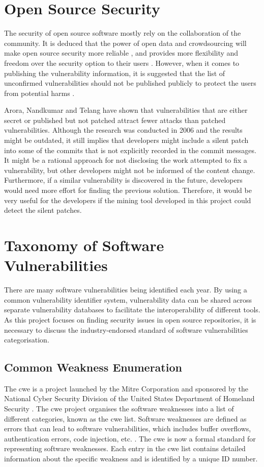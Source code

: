 \documentclass[12pt, a4paper]{report}
\begin{document}
\section{Open Source Security}
The security of open source software mostly rely on the collaboration of the community. It is
deduced that the power of open data and crowdsourcing will make open source security more reliable
\cite{hoepman_2007, witten_2001}, and provides more flexibility and freedom over the security option
to their users \cite{payne_2002}. However, when it comes to publishing the vulnerability
information, it is suggested that the list of unconfirmed vulnerabilities should not be published
publicly to protect the users from potential harms \cite{schryen_2011}.

Arora, Nandkumar and Telang \cite{arora_2006} have shown that vulnerabilities that are either secret
or published but not patched attract fewer attacks than patched vulnerabilities. Although the
research was conducted in 2006 and the results might be outdated, it still implies that developers
might include a silent patch into some of the commits that is not explicitly recorded in the commit
messages. It might be a rational approach for not disclosing the work attempted to fix a
vulnerability, but other developers might not be informed of the content change. Furthermore, if a
similar vulnerability is discovered in the future, developers would need more effort for finding the
previous solution. Therefore, it would be very useful for the developers if the mining tool
developed in this project could detect the silent patches.

\section{Taxonomy of Software Vulnerabilities}
There are many software vulnerabilities being identified each year. By using a common vulnerability
identifier system, vulnerability data can be shared across separate vulnerability databases to
facilitate the interoperability of different tools. As this project focuses on finding security
issues in open source repositories, it is necessary to discuss the industry-endorsed standard of
software vulnerabilities categorisation.

\subsection{Common Weakness Enumeration}
The \acrfull{cwe} is a project launched by the Mitre Corporation and sponsored by the National Cyber
Security Division of the United States Department of Homeland Security \cite{cwe}. The
\acrshort{cwe} project organises the software weaknesses into a list of different categories, known
as the \acrshort{cwe} list. Software weaknesses are defined as errors that can lead to software
vulnerabilities, which includes buffer overflows, authentication errors, code injection, etc.
\cite{cwe_faq}. The \acrshort{cwe} is now a formal standard for representing software weaknesses.
Each entry in the \acrshort{cwe} list contains detailed information about the specific weakness and
is identified by a unique ID number.
\end{document}
